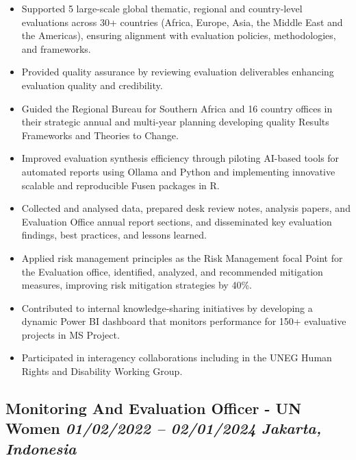 \documentclass[
  10pt,
]{article}
\providecommand{\tightlist}{%
  \setlength{\itemsep}{0pt}\setlength{\parskip}{0pt}}
\begin{document}
\begin{itemize}
\tightlist
\item
  Supported 5 large-scale global thematic, regional and country-level
  evaluations across 30+ countries (Africa, Europe, Asia, the Middle
  East and the Americas), ensuring alignment with evaluation policies,
  methodologies, and frameworks.
\item
  Provided quality assurance by reviewing evaluation deliverables
  enhancing evaluation quality and credibility.
\item
  Guided the Regional Bureau for Southern Africa and 16 country offices
  in their strategic annual and multi-year planning developing quality
  Results Frameworks and Theories to Change.
\item
  Improved evaluation synthesis efficiency through piloting AI-based
  tools for automated reports using Ollama and Python and implementing
  innovative scalable and reproducible Fusen packages in R.
\item
  Collected and analysed data, prepared desk review notes, analysis
  papers, and Evaluation Office annual report sections, and disseminated
  key evaluation findings, best practices, and lessons learned.
\item
  Applied risk management principles as the Risk Management focal Point
  for the Evaluation office, identified, analyzed, and recommended
  mitigation measures, improving risk mitigation strategies by 40\%.
\item
  Contributed to internal knowledge-sharing initiatives by developing a
  dynamic Power BI dashboard that monitors performance for 150+
  evaluative projects in MS Project.
\item
  Participated in interagency collaborations including in the UNEG Human
  Rights and Disability Working Group.
\end{itemize}

\subsection{\texorpdfstring{Monitoring And Evaluation Officer - UN Women
\emph{01/02/2022 -- 02/01/2024} \textbar{} \emph{Jakarta,
Indonesia}}{Monitoring And Evaluation Officer - UN Women 01/02/2022 -- 02/01/2024 \textbar{} Jakarta, Indonesia}}\label{monitoring-and-evaluation-officer---un-women-01022022-02012024-jakarta-indonesia}
\end{document}

